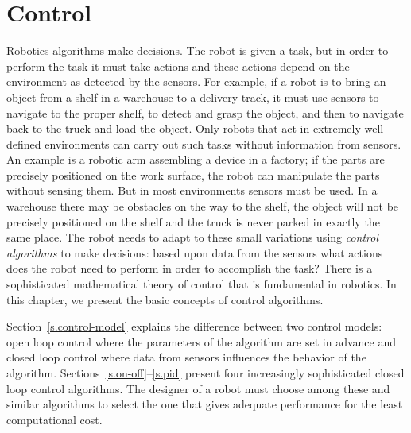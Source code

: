 
\chapter{Control}\label{ch.control}


Robotics algorithms make decisions. The robot is given a task, but in order to perform the task it must take actions and these actions depend on the environment as detected by the sensors. For example, if a robot is to bring an object from a shelf in a warehouse to a delivery track, it must use sensors to navigate to the proper shelf, to detect and grasp the object, and then to navigate back to the truck and load the object. Only robots that act in extremely well-defined environments can carry out such tasks without information from sensors. An example is a robotic arm assembling a device in a factory; if the parts are precisely positioned on the work surface, the robot can manipulate the parts without sensing them. But in most environments sensors must be used. In a warehouse there may be obstacles on the way to the shelf, the object will not be precisely positioned on the shelf and the truck is never parked in exactly the same place. The robot needs to adapt to these small variations using \emph{control algorithms} to make decisions: based upon data from the sensors what actions does the robot need to perform in order to accomplish the task? There is a sophisticated mathematical theory of control that is fundamental in robotics. In this chapter, we present the basic concepts of control algorithms.

Section~\ref{s.control-model} explains the difference between two control models: open loop control where the parameters of the algorithm are set in advance and closed loop control where data from sensors influences the behavior of the algorithm. Sections~\ref{s.on-off}--\ref{s.pid} present four increasingly sophisticated closed loop control algorithms. The designer of a robot must choose among these and similar algorithms to select the one that gives adequate performance for the least computational cost.

